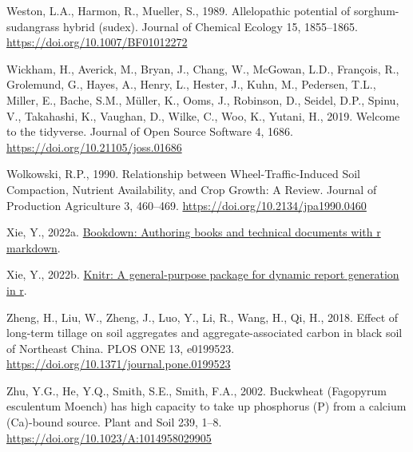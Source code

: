 \documentclass[
  12pt,
]{article}
\newlength{\cslhangindent}
\newlength{\cslentryspacingunit} %
\newenvironment{CSLReferences}[2] %
 {%
  \setlength{\parindent}{0pt}
  \ifodd #1
  \let\oldpar\par
  \def\par{\hangindent=\cslhangindent\oldpar}
  \fi
  \setlength{\parskip}{#2\cslentryspacingunit}
 }%
 {}
\begin{document}
\begin{CSLReferences}{1}{0}
\leavevmode{}%
Weston, L.A., Harmon, R., Mueller, S., 1989. Allelopathic potential of sorghum-sudangrass hybrid (sudex). Journal of Chemical Ecology 15, 1855--1865. \url{https://doi.org/10.1007/BF01012272}

\leavevmode{}%
Wickham, H., Averick, M., Bryan, J., Chang, W., McGowan, L.D., François, R., Grolemund, G., Hayes, A., Henry, L., Hester, J., Kuhn, M., Pedersen, T.L., Miller, E., Bache, S.M., Müller, K., Ooms, J., Robinson, D., Seidel, D.P., Spinu, V., Takahashi, K., Vaughan, D., Wilke, C., Woo, K., Yutani, H., 2019. Welcome to the {tidyverse}. Journal of Open Source Software 4, 1686. \url{https://doi.org/10.21105/joss.01686}

\leavevmode{}%
Wolkowski, R.P., 1990. Relationship between {Wheel-Traffic-Induced Soil Compaction}, {Nutrient Availability}, and {Crop Growth}: {A Review}. Journal of Production Agriculture 3, 460--469. \url{https://doi.org/10.2134/jpa1990.0460}

\leavevmode{}%
Xie, Y., 2022a. \href{https://github.com/rstudio/bookdown}{Bookdown: Authoring books and technical documents with r markdown}.

\leavevmode{}%
Xie, Y., 2022b. \href{https://yihui.org/knitr/}{Knitr: A general-purpose package for dynamic report generation in r}.

\leavevmode{}%
Zheng, H., Liu, W., Zheng, J., Luo, Y., Li, R., Wang, H., Qi, H., 2018. Effect of long-term tillage on soil aggregates and aggregate-associated carbon in black soil of {Northeast China}. PLOS ONE 13, e0199523. \url{https://doi.org/10.1371/journal.pone.0199523}

\leavevmode{}%
Zhu, Y.G., He, Y.Q., Smith, S.E., Smith, F.A., 2002. Buckwheat ({Fagopyrum} esculentum {Moench}) has high capacity to take up phosphorus ({P}) from a calcium ({Ca})-bound source. Plant and Soil 239, 1--8. \url{https://doi.org/10.1023/A:1014958029905}

\end{CSLReferences}
\end{document}
